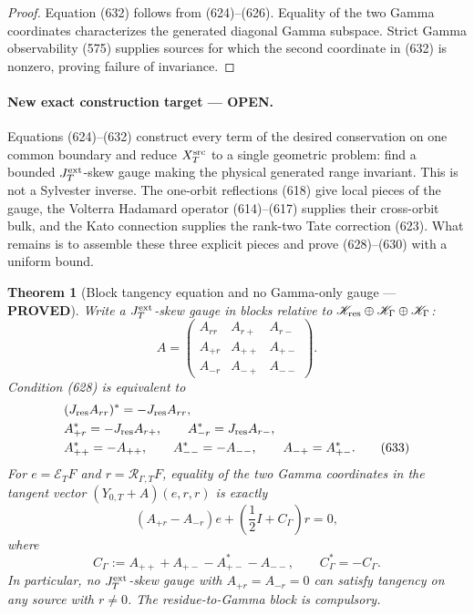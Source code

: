 \documentclass[11pt]{article}
\newtheorem{theorem}{Theorem}
\newcommand{\PROVED}{\textcolor{green!45!black}{\textbf{PROVED}}}
\newcommand{\OPEN}{\textcolor{red!70!black}{\textbf{OPEN}}}
\begin{document}
\begin{proof}
Equation (632) follows from (624)--(626).  Equality of the two Gamma
coordinates characterizes the generated diagonal Gamma subspace.  Strict
Gamma observability (575) supplies sources for which the second coordinate
in (632) is nonzero, proving failure of invariance.
\end{proof}

\paragraph{New exact construction target --- \OPEN.}
Equations (624)--(632) construct every term of the desired conservation on
one common boundary and reduce \(X_T^{\rm src}\) to a single geometric
problem: find a bounded \(J_T^{\rm ext}\)-skew gauge making the physical
generated range invariant.  This is not a Sylvester inverse.  The
one-orbit reflections (618) give local pieces of the gauge, the Volterra
Hadamard operator (614)--(617) supplies their cross-orbit bulk, and the
Kato connection supplies the rank-two Tate correction (623).  What remains
is to assemble these three explicit pieces and prove (628)--(630) with a
uniform bound.

\begin{theorem}[Block tangency equation and no Gamma-only gauge ---
\PROVED]
Write a \(J_T^{\rm ext}\)-skew gauge in blocks relative to
\(\mathscr K_{\rm res}\oplus\mathscr K_\Gamma\oplus
\mathscr K_\Gamma\):
\[
 A=\begin{pmatrix}
 A_{rr}&A_{r+}&A_{r-}\\
 A_{+r}&A_{++}&A_{+-}\\
 A_{-r}&A_{-+}&A_{--}
 \end{pmatrix}.
\]
Condition (628) is equivalent to
\begin{align}
 &(J_{\rm res}A_{rr})^*=-J_{\rm res}A_{rr},\notag\\
 &A_{+r}^*=-J_{\rm res}A_{r+},\qquad
   A_{-r}^*= J_{\rm res}A_{r-},\notag\\
 &A_{++}^*=-A_{++},\qquad A_{--}^*=-A_{--},\qquad
   A_{-+}=A_{+-}^*.                                  \tag{633}
\end{align}
For \(e=\mathcal E_TF\) and \(r=\mathcal R_{\Gamma,T}F\), equality of the
two Gamma coordinates in the tangent vector
\((Y_{0,T}+A)(e,r,r)\) is exactly
\begin{equation}
 \boxed{
 (A_{+r}-A_{-r})e+
 \left(\frac12I+C_\Gamma\right)r=0,}                 \tag{634}
\end{equation}
where
\begin{equation}
 C_\Gamma:=A_{++}+A_{+-}-A_{+-}^*-A_{--},
 \qquad C_\Gamma^*=-C_\Gamma.                        \tag{635}
\end{equation}
In particular, no \(J_T^{\rm ext}\)-skew gauge with
\(A_{+r}=A_{-r}=0\) can satisfy tangency on any source with \(r\ne0\).
The residue-to-Gamma block is compulsory.
\end{theorem}
\end{document}
